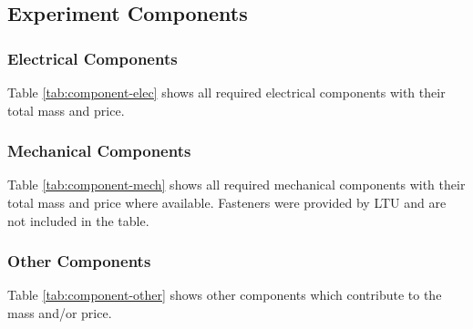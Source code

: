 \begin{landscape}
\subsection{Experiment Components} \label{components}
\label{sec:experiment-components}

\subsubsection{Electrical Components}
Table \ref{tab:component-elec} shows all required electrical components with their total mass and price.\\


    \end{landscape}

\begin{landscape}

\subsubsection{Mechanical Components}
Table \ref{tab:component-mech} shows all required mechanical components with their total mass and price where available. Fasteners were provided by LTU and are not included in the table. \\


\raggedbottom
\end{landscape}

\begin{landscape}
\subsubsection{Other Components}
Table \ref{tab:component-other} shows other components which contribute to the mass and/or price.\\



\raggedbottom
\end{landscape}